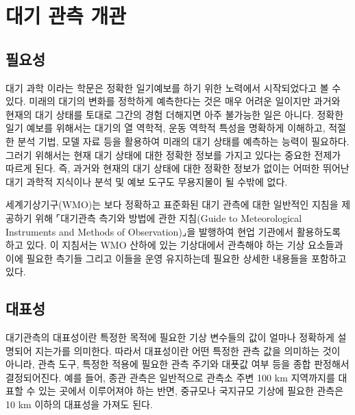 


\section{대기 관측 개관}

\subsection{필요성}

대기 과학 이라는 학문은 정확한 일기예보를 하기 위한 노력에서 시작되었다고 볼 수 있다. 미래의 대기의 변화를 정학하게 예측한다는 것은 매우 어려운 일이지만 과거와 현재의 대기 상태를 토대로 그간의 경험 더해지면 아주 불가능한 일은 아니다. 정확한 일기 예보를 위해서는 대기의 열 역학적, 운동 역학적 특성을 명확하게 이해하고, 적절한 분석 기법, 모델 자료 등을 활용하여 미래의 대기 상태를 예측하는 능력이 필요하다. 그러기 위해서는 현재 대기 상태에 대한 정확한 정보를 가지고 있다는 중요한 전제가 따르게 된다. 즉, 과거와 현재의 대기 상태에 대한 정확한 정보가 없이는 어떠한 뛰어난 대기 과학적 지식이나 분석 및 예보 도구도 무용지물이 될 수밖에 없다.

세계기상기구(WMO)는 보다 정확하고 표준화된 대기 관측에 대한 일반적인 지침을 제공하기 위해 ⌜대기관측 측기와 방법에 관한 지침(Guide to Meteorological Instruments and Methods of Observation)⌟을 발행하여 현업 기관에서 활용하도록 하고 있다. 이 지침서는 WMO 산하에 있는 기상대에서 관측해야 하는 기상 요소들과 이에 필요한 측기들 그리고 이들을 운영 유지하는데 필요한 상세한 내용들을 포함하고 있다. 

\subsection{대표성}

대기관측의 대표성이란 특정한 목적에 필요한 기상 변수들의 값이 얼마나 정확하게 설명되어 지는가를 의미한다. 따라서 대표성이란 어떤 특정한 관측 값을 의미하는 것이 아니라, 관측 도구, 특정한 적용에 필요한 관측 주기와 대푯값 여부 등을 종합 판정해서 결정되어진다. 예를 들어, 종관 관측은 일반적으로 관측소 주변 100 km 지역까지를 대표할 수 있는 곳에서 이루어져야 하는 반면, 중규모나 국지규모 기상에 필요한 관측은 10 km 이하의 대표성을 가져도 된다.


